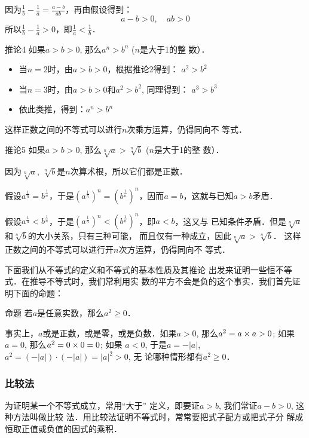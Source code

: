 因为$\frac{1}{b}-\frac{1}{a}=\frac{a-b}{ab}$，再由假设得到：
\[a-b>0,\quad ab>0\]
所以$\frac{1}{b}-\frac{1}{a}>0$，即$\frac{1}{a}<\frac{1}{b}$．

\begin{blk}{推论4}
    如果$a>b>0$, 那么$a^n>b^n$ ($n$是大于1的整
数）．
\end{blk}

\begin{itemize}
    \item 当$n=2$时，由$a>b>0$，根据推论2得到：
$a^2>b^2$
\item 当$n=3$时，由$a>b>0$和$a^2>b^2$, 同理得到：
$a^3>b^3$
\item 依此类推，得到：$a^n>b^n$
\end{itemize}
这样正数之间的不等式可以进行$n$次乘方运算，仍得同向不
等式．

\begin{blk}{推论5}
    如果$a>b>0$, 那么$\sqrt[n]{a}>\sqrt[n]{b}$ ($n$是大于1的整
数）．
\end{blk}

因为$\sqrt[n]{a}$, $\sqrt[n]{b}$是$n$次算术根，所以它们都是正数．

假设$a^{\tfrac{1}{n}}=b^{\tfrac{1}{n}}$，于是$\left(a^{\tfrac{1}{n}}\right)^n=\left(b^{\tfrac{1}{n}}\right)^n$，因而$a=b$，这就与已知$a>b$矛盾．

假设$a^{\tfrac{1}{n}}<b^{\tfrac{1}{n}}$，于是$\left(a^{\tfrac{1}{n}}\right)^n<\left(b^{\tfrac{1}{n}}\right)^n$，即$a<b$，这又与
已知条件矛盾．但是$\sqrt[n]{a}$和$\sqrt[n]{b}$的大小关系，只有三种可能，
而且仅有一种成立，因此$\sqrt[n]{a}>\sqrt[n]{b}$．
这样正数之间的不等式可以进行开$n$次方运算，仍得同向不
等式．

下面我们从不等式的定义和不等式的基本性质及其推论
出发来证明一些恒不等式．在推导不等式时，我们常利用实
数的平方不会是负的这个事实．我们首先证明下面的命题：

\begin{blk}{命题}
    若$a$是任意实数，那么$a^2\ge 0$．
\end{blk}

事实上，$a$或是正数，或是零，或是负数．如果$a>0$,
那么$a^2=a\times a>0$; 如果$a=0$, 那么$a^2=0\times0=0$; 如果
$a<0$, 于是$a=-|a|$, $a^2=(-|a|)\cdot (-|a|)=|a|^2>0$, 无
论哪种情形都有$a^2\ge 0$．

\subsubsection{比较法}

为证明某一个不等式成立，常用“大于”
定义，即要证$a>b$, 我们常证$a-b>0$, 这种方法叫做比较
法．用比较法证明不等式时，常常要把式子配方或把式子分
解成恒取正值或负值的因式的乘积．

